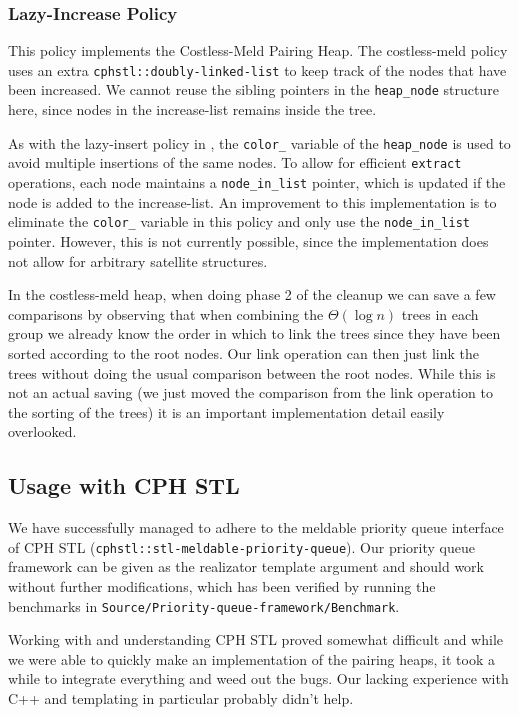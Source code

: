 \documentclass{DIKU-article}[2010/01/13]
\newcommand{\code}[1]{{\small\texttt{#1}}}
\begin{document}
\subsubsection{Lazy-Increase Policy}

This policy implements the Costless-Meld Pairing Heap. The
costless-meld policy uses an extra \code{cphstl::doubly-linked-list}
to keep track of the nodes that have been increased. We cannot reuse
the sibling pointers in the \code{heap\_node} structure here, since
nodes in the increase-list remains inside the tree.

As with the lazy-insert policy in , the
\code{color\_} variable of the \code{heap\_node} is used to avoid
multiple insertions of the same nodes. To allow for efficient
\code{extract} operations, each node maintains a \code{node\_in\_list}
pointer, which is updated if the node is added to the
increase-list. An improvement to this implementation is to eliminate
the \code{color\_} variable in this policy and only use the
\code{node\_in\_list} pointer. However, this is not currently
possible, since the implementation does not allow for arbitrary
satellite structures.

In the costless-meld heap, when doing phase 2 of the cleanup we can
save a few comparisons by observing that when combining the
$\Theta(\log n)$ trees in each group we already know the order in
which to link the trees since they have been sorted according to the
root nodes. Our link operation can then just link the trees without
doing the usual comparison between the root nodes. While this is not
an actual saving (we just moved the comparison from the link operation
to the sorting of the trees) it is an important implementation detail
easily overlooked.

\subsection{Usage with CPH STL}

We have successfully managed to adhere to the meldable priority queue
interface of CPH STL (\verb!cphstl::stl-meldable-priority-queue!). Our
priority queue framework can be given as the realizator template
argument and should work without further modifications, which has been
verified by running the benchmarks in
\verb!Source/Priority-queue-framework/Benchmark!.

Working with and understanding CPH STL proved somewhat difficult and while we
were able to quickly make an implementation of the pairing heaps, it took a
while to integrate everything and weed out the bugs. Our lacking experience with
C++ and templating in particular probably didn't help.
\end{document}
